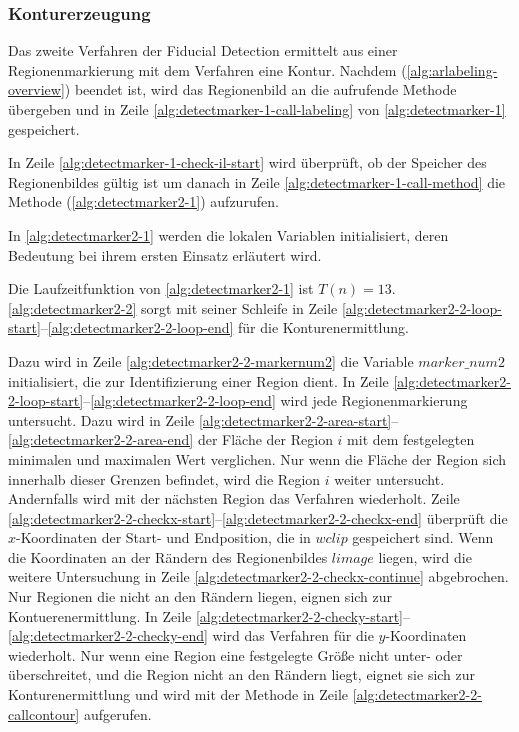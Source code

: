 \subsubsection{Konturerzeugung} %
\label{sec:konturerzeugung}

Das zweite Verfahren der Fiducial Detection ermittelt aus einer Regionenmarkierung mit dem Verfahren
  eine Kontur. Nachdem  (\autoref{alg:arlabeling-overview}) beendet ist,
 wird das Regionenbild an die aufrufende Methode  übergeben und in Zeile
 \ref{alg:detectmarker-1-call-labeling} von \autoref{alg:detectmarker-1} gespeichert.

In Zeile \ref{alg:detectmarker-1-check-il-start} wird überprüft, ob der Speicher des Regionenbildes gültig ist um
 danach in Zeile \ref{alg:detectmarker-1-call-method} die Methode 
 (\autoref{alg:detectmarker2-1}) aufzurufen.

In \autoref{alg:detectmarker2-1} werden die lokalen Variablen initialisiert, deren Bedeutung bei ihrem ersten Einsatz
 erläutert wird.

Die Laufzeitfunktion von \autoref{alg:detectmarker2-1} ist $T(n) = 13$. \autoref{alg:detectmarker2-2} sorgt mit seiner
 Schleife in Zeile \ref{alg:detectmarker2-2-loop-start}--\ref{alg:detectmarker2-2-loop-end} für die Konturenermittlung.

Dazu wird in Zeile \ref{alg:detectmarker2-2-markernum2} die Variable $\mathit{marker\_num2}$ initialisiert, die zur
 Identifizierung einer Region dient. In Zeile \ref{alg:detectmarker2-2-loop-start}--\ref{alg:detectmarker2-2-loop-end}
 wird jede Regionenmarkierung untersucht. Dazu wird in Zeile
 \ref{alg:detectmarker2-2-area-start}--\ref{alg:detectmarker2-2-area-end} der Fläche der Region $i$ mit dem festgelegten
 minimalen und maximalen Wert verglichen. Nur wenn die Fläche der Region sich innerhalb dieser Grenzen befindet, wird
 die Region $i$ weiter untersucht. Andernfalls wird mit der nächsten Region das Verfahren wiederholt. Zeile
 \ref{alg:detectmarker2-2-checkx-start}--\ref{alg:detectmarker2-2-checkx-end} überprüft die $x$-Koordinaten der
 Start- und Endposition, die in $\mathit{wclip}$ gespeichert sind. Wenn die Koordinaten an der Rändern des
 Regionenbildes $\mathit{limage}$ liegen, wird die weitere Untersuchung in Zeile
 \ref{alg:detectmarker2-2-checkx-continue} abgebrochen. Nur Regionen die nicht an den Rändern liegen, eignen sich zur
 Kontuerenermittlung. In Zeile \ref{alg:detectmarker2-2-checky-start}--\ref{alg:detectmarker2-2-checky-end} wird das
 Verfahren für die $y$-Koordinaten wiederholt. Nur wenn eine Region eine festgelegte Größe nicht unter- oder
 überschreitet, und die Region nicht an den Rändern liegt,
 eignet sie sich zur Konturenermittlung und wird mit der Methode  in Zeile
 \ref{alg:detectmarker2-2-callcontour} aufgerufen.

